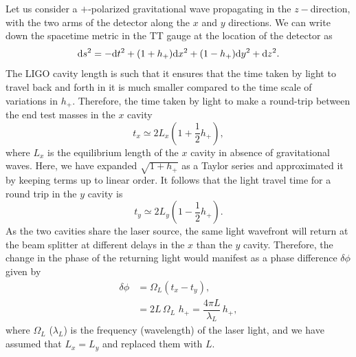 Let us consider a $+$-polarized gravitational wave propagating in the 
$z-$direction, with the two arms of the detector along the $x$ and $y$ directions.
We can write down the spacetime metric in the TT gauge at the
location of the detector as
%
\begin{equation}
 \mathrm{d} s^2 = -\mathrm{d} t^2 + (1+h_+)\mathrm{d} x^2 + (1-h_+)\mathrm{d} y^2 + \mathrm{d} z^2.
\end{equation}
% 
The LIGO 
cavity length is such that it ensures that the time taken by light to travel 
back and forth in it is much smaller compared to the time scale of variations in
$h_+$. Therefore, the time taken by light to make a round-trip between the end
test masses in the $x$ cavity 
% 
\begin{equation}
 t_x \simeq 2L_x (1 + \frac{1}{2}h_+),
\end{equation}
% 
where $L_x$ is the equilibrium length of the $x$ cavity in absence of 
gravitational waves. Here, we have expanded $\sqrt{1+h_+}$ as a Taylor series
and approximated it by keeping terms up to linear order. 
It follows that the light travel time for a round trip in 
the $y$ cavity is
% 
\begin{equation}
 t_y \simeq 2L_y (1 - \frac{1}{2}h_+).
\end{equation}
% 
As the two cavities share the laser source, the same light wavefront will 
return at the beam splitter at different delays in the $x$ than the $y$ cavity. 
Therefore, the change in the phase of the returning light would manifest as a 
phase difference $\delta\phi$ given by
% 
\begin{align}
 \delta\phi &= \Omega_L (t_x - t_y), \\ \nonumber
 &= 2 L\, \Omega_L\,\, h_+ = \dfrac{4\pi L}{\lambda_L}\,h_+,
\end{align}
where $\Omega_L$ ($\lambda_L$) is the frequency (wavelength) of the laser 
light, and we have assumed that $L_x = L_y$ and replaced them with $L$. 


